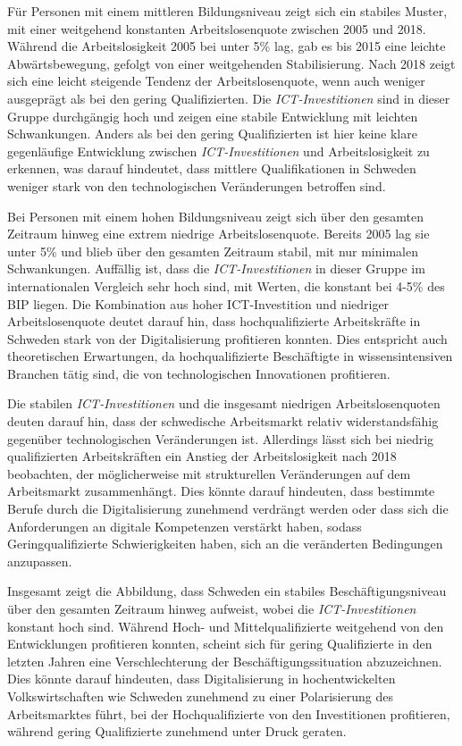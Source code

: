 Für Personen mit einem mittleren Bildungsniveau zeigt sich ein stabiles Muster, mit 
einer weitgehend konstanten Arbeitslosenquote zwischen 2005 und 2018. Während die 
Arbeitslosigkeit 2005 bei unter 5\% lag, gab es bis 2015 eine leichte Abwärtsbewegung, 
gefolgt von einer weitgehenden Stabilisierung. Nach 2018 zeigt sich eine leicht steigende 
Tendenz der Arbeitslosenquote, wenn auch weniger ausgeprägt als bei den gering 
Qualifizierten. Die \textit{\ac{ICT}-Investitionen} sind in dieser Gruppe durchgängig 
hoch und zeigen eine stabile Entwicklung mit leichten Schwankungen. Anders als bei den 
gering Qualifizierten ist hier keine klare gegenläufige Entwicklung zwischen 
\textit{\ac{ICT}-Investitionen} und Arbeitslosigkeit zu erkennen, was darauf hindeutet, 
dass mittlere Qualifikationen in Schweden weniger stark von den technologischen 
Veränderungen betroffen sind.

Bei Personen mit einem hohen Bildungsniveau zeigt sich über den gesamten Zeitraum 
hinweg eine extrem niedrige Arbeitslosenquote. Bereits 2005 lag sie unter 5\% und blieb 
über den gesamten Zeitraum stabil, mit nur minimalen Schwankungen. Auffällig ist, dass 
die \textit{\ac{ICT}-Investitionen} in dieser Gruppe im internationalen Vergleich sehr 
hoch sind, mit Werten, die konstant bei 4-5\% des \ac{BIP} liegen. Die Kombination aus 
hoher \ac{ICT}-Investition und niedriger Arbeitslosenquote deutet darauf hin, dass 
hochqualifizierte Arbeitskräfte in Schweden stark von der Digitalisierung profitieren 
konnten. Dies entspricht auch theoretischen Erwartungen, da hochqualifizierte 
Beschäftigte in wissensintensiven Branchen tätig sind, die von technologischen 
Innovationen profitieren.

Die stabilen \textit{\ac{ICT}-Investitionen} und die insgesamt niedrigen Arbeitslosenquoten 
deuten darauf hin, dass der schwedische Arbeitsmarkt relativ widerstandsfähig gegenüber 
technologischen Veränderungen ist. Allerdings lässt sich bei niedrig qualifizierten 
Arbeitskräften ein Anstieg der Arbeitslosigkeit nach 2018 beobachten, der 
möglicherweise mit strukturellen Veränderungen auf dem Arbeitsmarkt zusammenhängt. 
Dies könnte darauf hindeuten, dass bestimmte Berufe durch die Digitalisierung 
zunehmend verdrängt werden oder dass sich die Anforderungen an digitale Kompetenzen 
verstärkt haben, sodass Geringqualifizierte Schwierigkeiten haben, sich an die 
veränderten Bedingungen anzupassen.

Insgesamt zeigt die Abbildung, dass Schweden ein stabiles Beschäftigungsniveau über 
den gesamten Zeitraum hinweg aufweist, wobei die \textit{\ac{ICT}-Investitionen} 
konstant hoch sind. Während Hoch- und Mittelqualifizierte weitgehend von den 
Entwicklungen profitieren konnten, scheint sich für gering Qualifizierte in den 
letzten Jahren eine Verschlechterung der Beschäftigungssituation abzuzeichnen. Dies 
könnte darauf hindeuten, dass Digitalisierung in hochentwickelten Volkswirtschaften 
wie Schweden zunehmend zu einer Polarisierung des Arbeitsmarktes führt, bei der 
Hochqualifizierte von den Investitionen profitieren, während gering Qualifizierte 
zunehmend unter Druck geraten.

